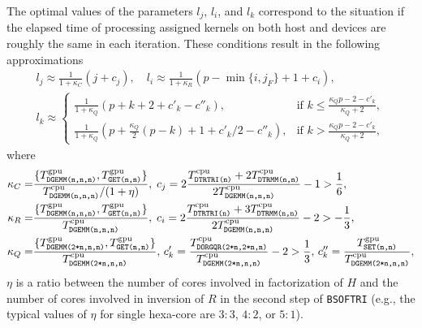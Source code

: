 \documentclass{llncs}
\newcommand{\Bsoftri}{\texttt{BSOFTRI}\xspace}
\begin{document}
    The optimal values of the parameters $l_j$, $l_i$, and $l_k$ 
    correspond to the situation 
    if the elapsed time of processing assigned kernels
    on both host and devices are roughly the same in each iteration. 
    These conditions result in the following approximations 
    \begin{align}
      \label{eq:l_j}
      l_j \approx \frac{1}{1 + \kappa_C} \left(j + c_j \right)
      , \quad %
      l_i \approx \frac{1}{1 + \kappa_R} \left( p-\min\{i,j_F\}+1 + c_i \right), 
      \\
      \label{eq:l_k}
      l_k \approx 
      \begin{cases}
        \displaystyle \frac{1}{1 + \kappa_Q} \left( p+k + 2 +c'_k - c''_k\right),
        & \mbox{if } k \leq \displaystyle \frac{ \kappa_{Q} p -2 - c'_{k}}{\kappa_{Q} + 2},\\ 
        \displaystyle \frac{1}{1 + \kappa_Q} \left(p  + \frac{\kappa_Q}{2}(p-k) + 1 + c'_k/2 - c''_k\right),
        & \mbox{if } k > \displaystyle \frac{ \kappa_{Q} p -2 - c'_{k}}{\kappa_{Q} + 2}, 
      \end{cases}
    \end{align}
    where 
    \begin{align*}
      \kappa_C =& \frac{\{T_{\texttt{DGEMM(n,n,n)}}^{\rm gpu},T^{\rm gpu}_{\texttt{GET(n,n)}}\}}{T^{\rm cpu}_{\texttt{DGEMM(n,n,n)}} / (1 + \eta)} 
      , \;
      c_j = 2 \frac{T^{\rm cpu}_{\texttt{DTRTRI(n)}} + 2 T^{\rm cpu}_{\texttt{DTRMM(n,n)}}}{2 T^{\rm cpu}_{\texttt{DGEMM(n,n,n)}}} - 1 > \frac{1}{6}
      ,\;
      \\
      \kappa_R =& \frac{\{T_{\texttt{DGEMM(n,n,n)}}^{\rm gpu},T^{\rm gpu}_{\texttt{GET(n,n)}}\}}{T^{\rm cpu}_{\texttt{DGEMM(n,n,n)}}} 
      , \;
      c_i = 
      2 \frac{T^{\rm cpu}_{\texttt{DTRTRI(n)}} + 3T^{\rm cpu}_{\texttt{DTRMM(n,n)}}}{2 T^{\rm cpu}_{\texttt{DGEMM(n,n,n)}}} - 2 > -\frac{1}{3},
      \\
      \kappa_Q  =& \frac{\{T_{\texttt{DGEMM(2*n,n,n)}}^{\rm gpu},T^{\rm gpu}_{\texttt{GET(n,n)}}\}}{T^{\rm cpu}_{\texttt{DGEMM(2*n,n,n)}}} 
      , \,
      c'_k  = \frac{T^{\rm cpu}_\texttt{DORGQR(2*n,2*n,n)}}{T^{\rm cpu}_\texttt{DGEMM(2*n,n,n)}} - 2 > \frac{1}{3}
      , \,
      c''_k = {
        \frac{T^{\rm gpu}_{\texttt{SET(n,n)}}}{%
          T_{\texttt{DGEMM(2*n,n,n)}}^{\rm cpu}}}
      ,
    \end{align*}
    $\eta$ is a ratio between the number of cores involved in factorization of $H$
    and the number of cores involved in inversion of $R$ in the second step of \Bsoftri 
    (e.g., the typical values of $\eta$ for single hexa-core are $3:3$, $4:2$, or $5:1$).
\end{document}
